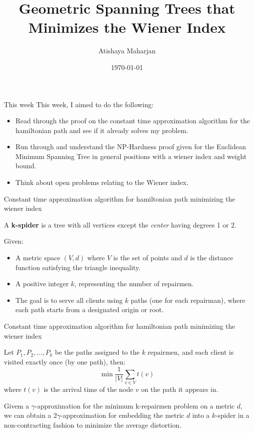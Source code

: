 \documentclass[11pt]{beamer}
\author[Atishaya Maharjan]{Atishaya Maharjan}
\title{Geometric Spanning Trees that Minimizes the Wiener Index}
\institute[]{University of Manitoba\par Geometric, Approximation, and Distributed Algorithms (GADA) lab}
\date{\today}
\begin{document}
\begin{frame}
	\titlepage
\end{frame}

\begin{frame}{This week}
	This week, I aimed to do the following:
	\begin{itemize}
		\item Read through the proof on the constant time approximation algorithm for the hamiltonian path and see if it already solves my problem.
		      \pause
		\item Run through and understand the NP-Hardness proof given for the Euclidean Minimum Spanning Tree in general positions with a wiener index and weight bound.
		      \pause
		\item Think about open problems relating to the Wiener index.
	\end{itemize}
\end{frame}

\begin{frame}{Constant time approximation algorithm for hamiltonian path minimizing the wiener index}
	\begin{definition}[k-spider]
		A \textbf{k-spider} is a tree with all vertices except the \textit{center} having degrees 1 or 2.
	\end{definition}

	\begin{definition}
		Given:
		\begin{itemize}
			\item A metric space $(V, d)$ where $V$ is the set of points and $d$ is the distance function satisfying the triangle inequality.
			\item A positive integer $k$, representing the number of repairmen.
			\item The goal is to serve all clients using $k$ paths (one for each repairman), where each path starts from a designated origin or root.
		\end{itemize}
	\end{definition}
\end{frame}

\begin{frame}{Constant time approximation algorithm for hamiltonian path minimizing the wiener index}
	\begin{definition}
		Let $P_1, P_2, \dots, P_k$ be the paths assigned to the $k$ repairmen, and each client is visited exactly once (by one path), then:
		$$\min \dfrac{1}{|V|}\displaystyle\sum_{v\in V}t(v)$$
		where $t(v)$ is the arrival time of the node $v$ on the path it appears in.
	\end{definition}

	\begin{theorem}
		Givem a $\gamma$-approximation for the minimum k-repairmen problem on a metric $d$, we can obtain a $2\gamma$-approximation for embedding the metric $d$ into a $k$-spider in a non-contracting fashion to minimize the average distortion.
	\end{theorem}
\end{frame}
\end{document}
